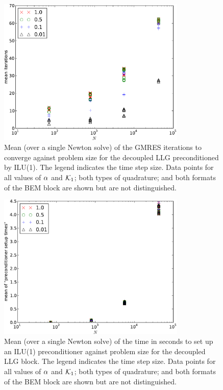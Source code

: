\newcommand{\manydatapointsTimeStepLegend}{Data points for all values of $\dampc$ and $\kone$; both types of quadrature; and both formats of the BEM block are shown but are not distinguished.}
\newcommand{\manydatapointsPrecLegend}{Data points for all values of $\dampc$, $\kone$, and for both formats of the BEM block are shown but are not distinguished.}

\newcommand{\newtonmean}{Mean (over a single Newton solve) of the}

\begin{figure}
  \centering
  \includegraphics[width=0.8\textwidth]{plots/linear_solvers/ilu-1decoupleddummy-meanofnsolveritersvsinitialnnode.pdf}
  \caption{
    \newtonmean{}
    GMRES iterations to converge against problem size for the decoupled LLG preconditioned by ILU(1).
    The legend indicates the time step size.
    \manydatapointsTimeStepLegend{}
  }
  \label{fig:its-ilu-decoupled}
\end{figure}

\begin{figure}
  \centering
  \includegraphics[width=0.8\textwidth]{plots/linear_solvers/ilu-1decoupleddummy-meanofpreconditionersetuptimesvsinitialnnode.pdf}
  \caption{
    \newtonmean{}
    time in seconds to set up an ILU(1) preconditioner against problem size for the decoupled LLG block.
    The legend indicates the time step size.
    \manydatapointsTimeStepLegend{}
  }
  \label{fig:times-ilu-decoupled}
\end{figure}


